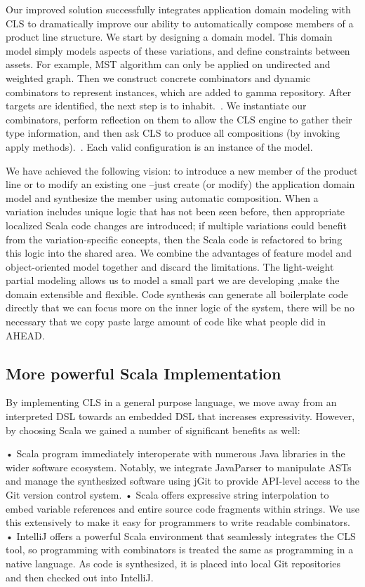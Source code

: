 


Our improved solution successfully integrates application domain modeling with CLS to dramatically improve our
ability to automatically compose members of a product line structure. We start by designing a domain model.
This domain model simply models aspects of these variations, and define constraints between assets. For example,
MST algorithm can only be applied on undirected and weighted graph. Then we construct concrete combinators and dynamic
combinators to represent instances, which are added to gamma repository. After targets are identified, the next step
is to inhabit.~\cite{Ddder2013UsingII}. We instantiate our combinators, perform reflection on them to allow the CLS engine to gather their type
information, and then ask CLS to produce all compositions (by invoking apply methods).~\cite{Heineman:2015:TMO:2791060.2791076}.
Each valid configuration is an instance of the model.

We have achieved the following vision: to introduce a new member of the product line or to modify an
existing one –just create (or modify) the application domain model and synthesize the member using
automatic composition. When a variation includes unique logic that has not been seen before, then appropriate
 localized Scala code changes are introduced; if multiple variations could benefit from the variation-specific concepts,
  then the Scala code is refactored to bring this logic into the shared area. We combine the advantages
  of feature model and object-oriented model together and discard  the limitations.
  The light-weight partial modeling allows us to model a small part we are developing
 ,make the domain extensible and flexible. Code synthesis can generate all boilerplate code directly
 that we can focus more on the inner logic of the system, there will be no necessary that we
 copy paste large amount of code like what people did in AHEAD.

 \subsection{More powerful Scala Implementation}

 By implementing CLS in a general purpose language, we move away from an interpreted DSL towards an embedded DSL
 that increases expressivity. However, by choosing Scala we gained a number of significant benefits as well:

 • Scala program immediately interoperate with numerous Java libraries in the wider software ecosystem. Notably,
 we integrate JavaParser to manipulate ASTs and manage the synthesized software using jGit to
 provide API-level access to the Git version control system.
 • Scala offers expressive string interpolation to embed variable references and entire source code fragments within strings.
 We use this extensively to make it easy for programmers to write readable combinators.
 • IntelliJ offers a powerful Scala environment that seamlessly integrates the CLS tool, so programming with
 combinators is treated the same as programming in a native language. As code is synthesized, it is placed
 into local Git repositories and then checked out into IntelliJ.

